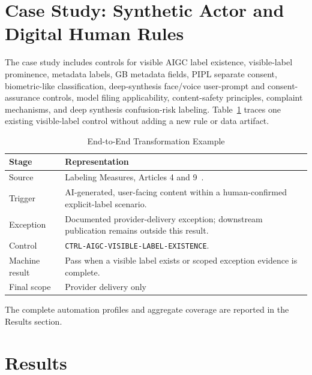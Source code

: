 \documentclass[10pt,journal]{IEEEtran}
\begin{document}
\section{Case Study: Synthetic Actor and Digital Human Rules}

The case study includes controls for visible AIGC label existence, visible-label prominence, metadata labels, GB metadata fields, PIPL separate consent, biometric-like classification, deep-synthesis face/voice user-prompt and consent-assurance controls, model filing applicability, content-safety principles, complaint mechanisms, and deep synthesis confusion-risk labeling. Table~\ref{tab:end-to-end-example} traces one existing visible-label control without adding a new rule or data artifact.

\begin{table}[t]
\caption{End-to-End Transformation Example}
\label{tab:end-to-end-example}
\centering
\footnotesize
\begin{tabularx}{\columnwidth}{@{}p{}X@{}}
\toprule
\textbf{Stage} & \textbf{Representation} \\
\midrule
Source & Labeling Measures, Articles 4 and 9~\cite{aigcLabelingMeasures2025}. \\
Trigger & AI-generated, user-facing content within a human-confirmed explicit-label scenario. \\
Exception & Documented provider-delivery exception; downstream publication remains outside this result. \\
Control & \texttt{CTRL-AIGC-VISIBLE-LABEL-EXISTENCE}. \\
Machine result & Pass when a visible label exists or scoped exception evidence is complete. \\
Final scope & Provider delivery only \\
\bottomrule
\end{tabularx}
\end{table}

The complete automation profiles and aggregate coverage are reported in the Results section.

\section{Results}
\end{document}
